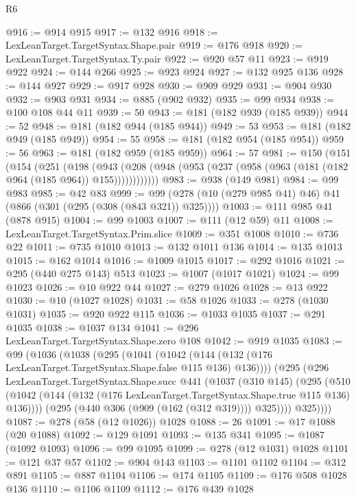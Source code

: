 \begin{lexlean}{R6}
\begin{coremodule}
@916 := @914 @915
@917 := @132 @916
@918 := LexLeanTarget.TargetSyntax.Shape.pair
@919 := @176 @918
@920 := LexLeanTarget.TargetSyntax.Ty.pair
@922 := @920 @57 @11
@923 := @919 @922
@924 := @144 @266
@925 := @923 @924
@927 := @132 @925 @136
@928 := @144 @927
@929 := @917 @928
@930 := @909 @929
@931 := @904 @930
@932 := @903 @931
@934 := @885 (@902 @932)
@935 := @99 @934
@938 := @100 @108 @44 @11
@939 := 50
@943 := @181 (@182 @939 (@185 @939))
@944 := 52
@948 := @181 (@182 @944 (@185 @944))
@949 := 53
@953 := @181 (@182 @949 (@185 @949))
@954 := 55
@958 := @181 (@182 @954 (@185 @954))
@959 := 56
@963 := @181 (@182 @959 (@185 @959))
@964 := 57
@981 := @150
    (@151
      (@154
        (@251
          (@198
            (@943 (@208 (@948 (@953 (@237 (@958 (@963 (@181 (@182 @964 (@185 @964)) @155))))))))))))
@983 := @938 (@149 @981)
@984 := @99 @983
@985 := @42 @83
@999 := @99 (@278 (@10 (@279 @985 @41) @46) @41 (@866 (@301 (@295 (@308 (@843 @321)) @325))))
@1003 := @111 @985 @41 (@878 @915)
@1004 := @99 @1003
@1007 := @111 (@12 @59) @11
@1008 := LexLeanTarget.TargetSyntax.Prim.slice
@1009 := @351 @1008
@1010 := @736 @22
@1011 := @735 @1010
@1013 := @132 @1011 @136
@1014 := @135 @1013
@1015 := @162 @1014
@1016 := @1009 @1015
@1017 := @292 @1016
@1021 := @295 (@440 @275 @143) @513
@1023 := @1007 (@1017 @1021)
@1024 := @99 @1023
@1026 := @10 @922 @44
@1027 := @279 @1026
@1028 := @13 @922
@1030 := @10 (@1027 @1028)
@1031 := @58 @1026
@1033 := @278 (@1030 @1031)
@1035 := @920 @922 @115
@1036 := @1033 @1035
@1037 := @291 @1035
@1038 := @1037 @134
@1041 := @296 LexLeanTarget.TargetSyntax.Shape.zero @108
@1042 := @919 @1035
@1083 := @99
    (@1036
      (@1038
        (@295
          (@1041 (@1042 (@144 (@132 (@176 LexLeanTarget.TargetSyntax.Shape.false @115 @136) @136))))
          (@295
            (@296
              LexLeanTarget.TargetSyntax.Shape.succ
              @441
              (@1037
                (@310 @145)
                (@295
                  (@510
                    (@1042
                      (@144 (@132 (@176 LexLeanTarget.TargetSyntax.Shape.true @115 @136) @136))))
                  (@295 (@440 @306 (@909 (@162 (@312 @319)))) @325))))
            @325))))
@1087 := @278 (@58 (@12 @1026)) @1028
@1088 := 26
@1091 := @17 @1088 (@20 @1088)
@1092 := @129 @1091
@1093 := @135 @341
@1095 := @1087 (@1092 @1093)
@1096 := @99 @1095
@1099 := @278 (@12 @1031) @1028
@1101 := @121 @37 @57
@1102 := @904 @143
@1103 := @1101 @1102
@1104 := @312 @891
@1105 := @887 @1104
@1106 := @174 @1105
@1109 := @176 @508 @1028 @136
@1110 := @1106 @1109
@1112 := @176 @439 @1028

\end{coremodule}
\end{lexlean}
